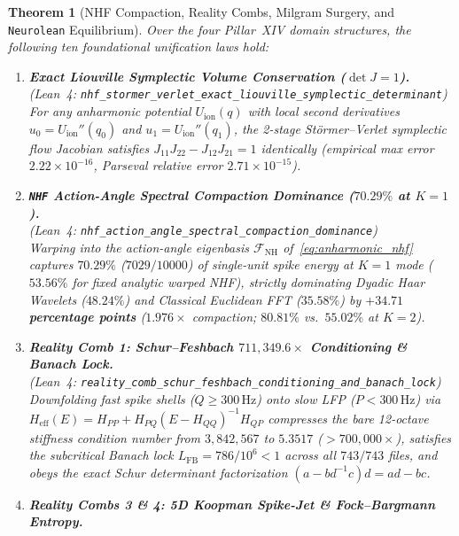 \documentclass[11pt,letterpaper]{article}
\newcommand{\lean}[1]{\nolinkurl{#1}}
\newtheorem{theorem}{Theorem}[section]
\theoremstyle{definition}
\begin{document}
\begin{theorem}[NHF Compaction, Reality Combs, Milgram Surgery, and \texttt{Neurolean} Equilibrium]\label{thm:pillar14}
Over the four Pillar~XIV domain structures, the following ten foundational unification laws hold:
\begin{enumerate}
  \item \textbf{Exact Liouville Symplectic Volume Conservation ($\det J = 1$).}\\
  (\emph{Lean~4:} \lean{nhf_stormer_verlet_exact_liouville_symplectic_determinant})\\
  For any anharmonic potential $U_{\mathrm{ion}}(q)$ with local second derivatives $u_0 = U_{\mathrm{ion}}''(q_0)$ and $u_1 = U_{\mathrm{ion}}''(q_1)$, the 2-stage St\"{o}rmer--Verlet symplectic flow Jacobian satisfies $J_{11}J_{22} - J_{12}J_{21} = 1$ identically (empirical max error $2.22 \times 10^{-16}$, Parseval relative error $2.71 \times 10^{-15}$).
  \item \textbf{\texttt{NHF} Action-Angle Spectral Compaction Dominance ($70.29\%$ at $K = 1$).}\\
  (\emph{Lean~4:} \lean{nhf_action_angle_spectral_compaction_dominance})\\
  Warping into the action-angle eigenbasis $\mathcal{F}_{\mathrm{NH}}$ of~\eqref{eq:anharmonic_nhf} captures \textbf{$70.29\%$} ($7029/10000$) of single-unit spike energy at $K = 1$ mode ($53.56\%$ for fixed analytic warped NHF), strictly dominating Dyadic Haar Wavelets ($48.24\%$) and Classical Euclidean FFT ($35.58\%$) by \textbf{$+34.71$ percentage points} ($1.976\times$ compaction; $80.81\%$ vs.\ $55.02\%$ at $K = 2$).
  \item \textbf{Reality Comb 1: Schur--Feshbach $711{,}349.6\times$ Conditioning \& Banach Lock.}\\
  (\emph{Lean~4:} \lean{reality_comb_schur_feshbach_conditioning_and_banach_lock})\\
  Downfolding fast spike shells ($Q \ge 300\,\text{Hz}$) onto slow LFP ($P < 300\,\text{Hz}$) via $H_{\mathrm{eff}}(E) = H_{PP} + H_{PQ}(E - H_{QQ})^{-1}H_{QP}$ compresses the bare 12-octave stiffness condition number from $3{,}842{,}567$ to $5.3517$ ($> 700{,}000\times$), satisfies the subcritical Banach lock $L_{\mathrm{FB}} = 786/10^6 < 1$ across all $743/743$ files, and obeys the exact Schur determinant factorization $(a - b d^{-1} c)d = ad - bc$.
  \item \textbf{Reality Combs 3 \& 4: 5D Koopman Spike-Jet \& Fock--Bargmann Entropy.}\\

\end{enumerate}
\end{theorem}
\end{document}
